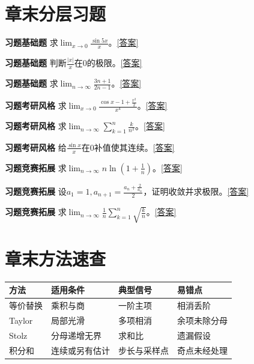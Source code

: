 




\section*{章末分层习题}
\label{q:1:1}\par\noindent\textbf{习题\theexercise\quad 基础题} 求$\lim_{x\to0}\frac{\sin5x}{x}$。\quad\hyperref[a:1:1]{[答案]}\par
{}\label{q:1:2}\par\noindent\textbf{习题\theexercise\quad 基础题} 判断$\frac{|x|}{x}$在0的极限。\quad\hyperref[a:1:2]{[答案]}\par
{}\label{q:1:3}\par\noindent\textbf{习题\theexercise\quad 基础题} 求$\lim_{n\to\infty}\frac{3n+1}{2n-1}$。\quad\hyperref[a:1:3]{[答案]}\par
{}\label{q:1:4}\par\noindent\textbf{习题\theexercise\quad 考研风格} 求$\lim_{x\to0}\frac{\cos x-1+\frac{x^2}{2}}{x^4}$。\quad\hyperref[a:1:4]{[答案]}\par
{}\label{q:1:5}\par\noindent\textbf{习题\theexercise\quad 考研风格} 求$\lim_{n\to\infty}\sum_{k=1}^n \frac{k}{n^2}$。\quad\hyperref[a:1:5]{[答案]}\par
{}\label{q:1:6}\par\noindent\textbf{习题\theexercise\quad 考研风格} 给$\frac{\sin x}{x}$在0补值使其连续。\quad\hyperref[a:1:6]{[答案]}\par
{}\label{q:1:7}\par\noindent\textbf{习题\theexercise\quad 竞赛拓展} 求$\lim_{n\to\infty}n\ln(1+\frac{1}{n})$。\quad\hyperref[a:1:7]{[答案]}\par
{}\label{q:1:8}\par\noindent\textbf{习题\theexercise\quad 竞赛拓展} 设$a_1=1,a_{n+1}=\frac{a_n+\frac{2}{a_n}}{2}$，证明收敛并求极限。\quad\hyperref[a:1:8]{[答案]}\par
{}\label{q:1:9}\par\noindent\textbf{习题\theexercise\quad 竞赛拓展} 求$\lim_{n\to\infty}\frac1n\sum_{k=1}^n\sqrt{\frac{k}{n}}$。\quad\hyperref[a:1:9]{[答案]}\par
\section*{章末方法速查}
\par\noindent\begin{tabularx}{\textwidth}{p{23mm}XXX}\toprule 方法&适用条件&典型信号&易错点\\\midrule
等价替换&乘积与商&一阶主项&相消丢阶\\Taylor&局部光滑&多项相消&余项未除分母\\Stolz&分母递增无界&求和比&遗漏假设\\积分和&连续或另有估计&步长与采样点&奇点未经处理\\
\bottomrule\end{tabularx}
